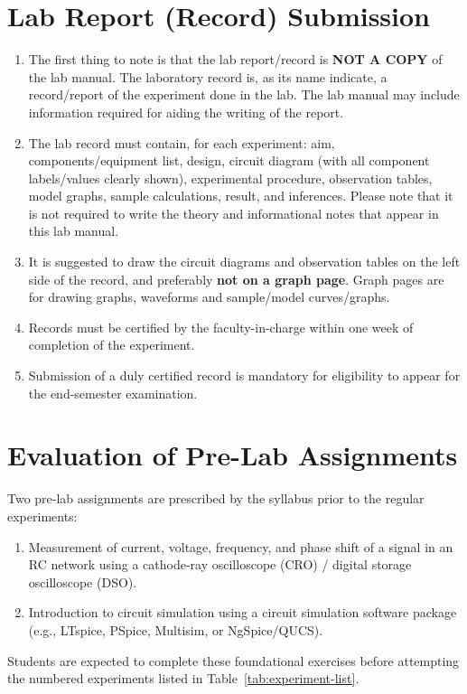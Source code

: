 \section*{Lab Report (Record) Submission}
\begin{enumerate}[label=\arabic*.]
	\item The first thing to note is that the lab report/record is \textbf{NOT A COPY} of the lab manual. The laboratory record is, as its name indicate, a record/report of the experiment done in the lab. The lab manual may include information required for aiding the writing of the report. 
	\item The lab record must contain, for each experiment: aim, components/equipment list, design, circuit diagram (with all component labels/values clearly shown), experimental procedure, observation tables, model graphs, sample calculations, result, and inferences. Please note that it is not required to write the theory and informational notes that appear in this lab manual. 
	\item It is suggested to draw the circuit diagrams and observation tables on the left side of the record, and preferably \textbf{not on a graph page}. Graph pages are for drawing graphs, waveforms and sample/model curves/graphs.
	\item Records must be certified by the faculty-in-charge within one week of completion of the experiment.
	\item Submission of a duly certified record is mandatory for eligibility to appear for the end-semester examination.
\end{enumerate}

\section*{Evaluation of Pre-Lab Assignments}
Two pre-lab assignments are prescribed by the syllabus prior to the regular experiments:
\begin{enumerate}[label=\arabic*.]
	\item Measurement of current, voltage, frequency, and phase shift of a signal in an RC network using a cathode-ray oscilloscope (CRO) / digital storage oscilloscope (DSO).
	\item Introduction to circuit simulation using a circuit simulation software package (e.g., LTspice, PSpice, Multisim, or NgSpice/QUCS).
\end{enumerate}
Students are expected to complete these foundational exercises before attempting the numbered experiments listed in Table~\ref{tab:experiment-list}.